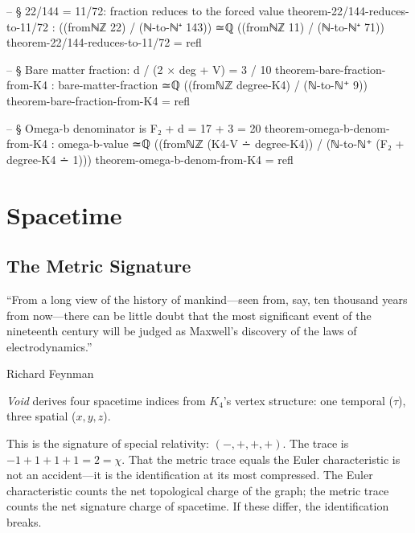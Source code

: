 \documentclass[11pt,a4paper]{book}
\begin{document}
\begin{code}
  -- § 22/144 = 11/72: fraction reduces to the forced value
  theorem-22/144-reduces-to-11/72 :
    ((fromℕℤ 22) / (ℕ-to-ℕ⁺ 143)) ≃ℚ ((fromℕℤ 11) / (ℕ-to-ℕ⁺ 71))
  theorem-22/144-reduces-to-11/72 = refl

  -- § Bare matter fraction: d / (2 × deg + V) = 3 / 10
  theorem-bare-fraction-from-K4 :
    bare-matter-fraction ≃ℚ ((fromℕℤ degree-K4) / (ℕ-to-ℕ⁺ 9))
  theorem-bare-fraction-from-K4 = refl

  -- § Omega-b denominator is F₂ + d = 17 + 3 = 20
  theorem-omega-b-denom-from-K4 :
    omega-b-value ≃ℚ ((fromℕℤ (K4-V ∸ degree-K4)) / (ℕ-to-ℕ⁺ (F₂ + degree-K4 ∸ 1)))
  theorem-omega-b-denom-from-K4 = refl
\end{code}

\part{Spacetime}

\chapter{The Metric Signature}
\label{ch:metric-signature}

\epigraph{``From a long view of the history of mankind---seen from, say, ten thousand years from now---there can be little doubt that the most significant event of the nineteenth century will be judged as Maxwell's discovery of the laws of electrodynamics.''}{Richard Feynman}

\textit{Void} derives four spacetime indices from $K_4$'s vertex structure: one temporal ($\tau$), three spatial ($x, y, z$).%

This is the signature of special relativity: $(-,+,+,+)$. The trace is $-1 + 1 + 1 + 1 = 2 = \chi$. That the metric trace equals the Euler characteristic is not an accident---it is the identification at its most compressed. The Euler characteristic counts the net topological charge of the graph; the metric trace counts the net signature charge of spacetime. If these differ, the identification breaks.
\end{document}
